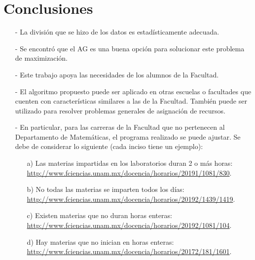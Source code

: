 \chapter{Conclusiones}

\begin{itemize}
\item[-] La división que se hizo de los datos es estadísticamente  adecuada.

\item[-] Se encontró que el AG es una buena opción para solucionar este problema de maximización.

\item[-] Este trabajo apoya las necesidades de los alumnos de la Facultad.

\item[-] El algoritmo propuesto puede ser aplicado en otras escuelas o facultades que cuenten con características similares a las de la Facultad. También puede ser utilizado para resolver problemas generales de asignación de recursos.

\item[-] En particular, para las carreras de la Facultad que no pertenecen al Departamento de Matemáticas, el programa realizado se puede ajustar. Se debe de considerar lo siguiente (cada inciso tiene un ejemplo):

\begin{itemize}
\item[a)] Las materias impartidas en los laboratorios duran 2 o más horas: \url{http://www.fciencias.unam.mx/docencia/horarios/20191/1081/830}.

\item[b)] No todas las materias se imparten todos los días: \url{http://www.fciencias.unam.mx/docencia/horarios/20192/1439/1419}.

\item[c)] Existen materias que no duran horas enteras: \url{http://www.fciencias.unam.mx/docencia/horarios/20192/1081/104}.

\item[d)] Hay materias que no inician en horas enteras: \url{http://www.fciencias.unam.mx/docencia/horarios/20172/181/1601}.
\end{itemize}
\end{itemize}

